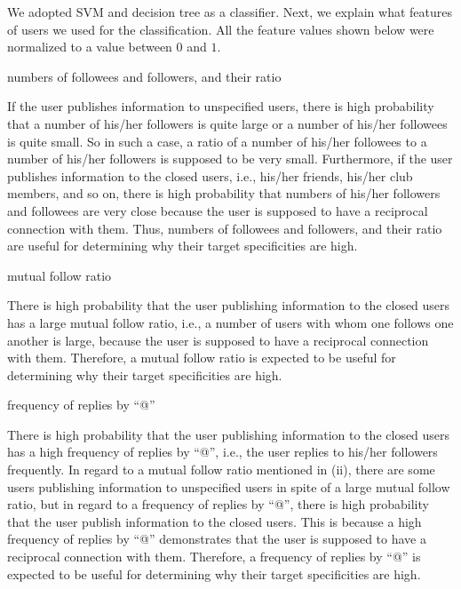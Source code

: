 We adopted SVM and decision tree as a classifier.  Next, we explain what
features of users we used for the classification.  All the feature
values shown below were normalized to a value between $0$ and $1$.

\begin{description}
\bf {\item[(i)] numbers of followees and followers, and their ratio}
\end{description}

If the user publishes information to unspecified users, there is high
probability that a number of his/her followers is quite large or a
number of his/her followees is quite small.  So in such a case, a ratio
of a number of his/her followees to a number of his/her followers is
supposed to be very small.  Furthermore, if the user publishes
information to the closed users, i.e., his/her friends, his/her club
members, and so on, there is high probability that numbers of his/her
followers and followees are very close because the user is supposed to
have a reciprocal connection with them.  Thus, numbers of followees and
followers, and their ratio are useful for determining why their target
specificities are high.

\begin{description}
\bf {\item[(ii)] mutual follow ratio}
\end{description}

There is high probability that the user publishing information to the
closed users has a large mutual follow ratio, i.e., a number of users
with whom one follows one another is large, because the user is supposed
to have a reciprocal connection with them.  Therefore, a mutual follow
ratio is expected to be useful for determining why their target
specificities are high.

\begin{description}
\bf {\item[(iii)] frequency of replies by ``@''}
\end{description}

There is high probability that the user publishing information to the
closed users has a high frequency of replies by ``@'', i.e., the user
replies to his/her followers frequently. In regard to a mutual follow
ratio mentioned in (ii), there are some users publishing information to
unspecified users in spite of a large mutual follow ratio, but in regard
to a frequency of replies by ``@'', there is high probability that the
user publish information to the closed users.  This is because a high
frequency of replies by ``@'' demonstrates that the user is supposed to
have a reciprocal connection with them.  Therefore, a frequency of
replies by ``@'' is expected to be useful for determining why their
target specificities are high.

